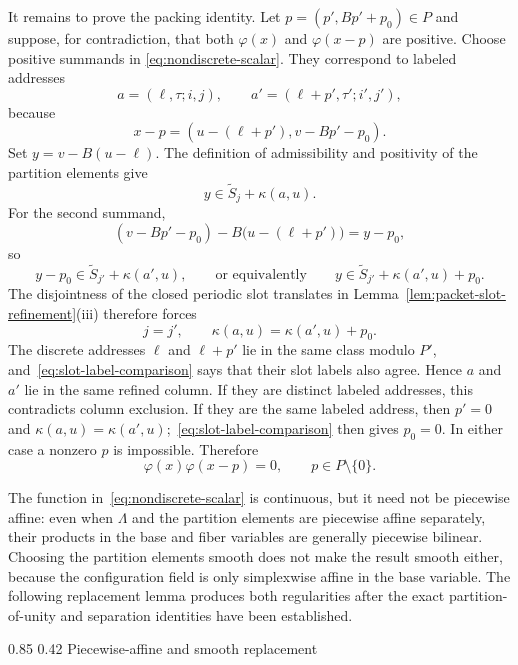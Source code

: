 \documentclass[11pt,reqno]{amsart}
\makeatletter
\numberwithin{equation}{section}
\renewcommand\subsection{\@startsection{subsection}{2}{\z@}%
  {0.85\baselineskip \@plus 0.25\baselineskip \@minus 0.10\baselineskip}%
  {0.42\baselineskip}%
  {\normalfont\bfseries}}
\theoremstyle{definition}
\theoremstyle{remark}
\makeatother
\begin{document}
It remains to prove the packing identity.  Let
$p=(p',Bp'+p_0)\in P$ and suppose, for contradiction, that both
$\varphi(x)$ and $\varphi(x-p)$ are positive.  Choose positive summands in
\eqref{eq:nondiscrete-scalar}.  They correspond to labeled addresses
\[
 a=(\ell,\tau;i,j),
 \qquad
 a'=(\ell+p',\tau';i',j'),
\]
because
\[
 x-p=(u-(\ell+p'),v-Bp'-p_0).
\]
Set $y=v-B(u-\ell)$.  The definition of admissibility and positivity of the
partition elements give
\[
 y\in\widetilde S_j+\kappa(a,u).
\]
For the second summand,
\[
 (v-Bp'-p_0)-B\bigl(u-(\ell+p')\bigr)=y-p_0,
\]
so
\[
 y-p_0\in\widetilde S_{j'}+\kappa(a',u),
 \qquad\text{or equivalently}\qquad
 y\in\widetilde S_{j'}+\kappa(a',u)+p_0.
\]
The disjointness of the closed periodic slot translates in
Lemma~\ref{lem:packet-slot-refinement}(iii) therefore forces
\begin{equation}\label{eq:slot-label-comparison}
 j=j',
 \qquad
 \kappa(a,u)=\kappa(a',u)+p_0.
\end{equation}
The discrete addresses $\ell$ and $\ell+p'$ lie in the same class modulo
$P'$, and~\eqref{eq:slot-label-comparison} says that their slot labels also
agree.  Hence $a$ and $a'$ lie in the same refined column.  If they are
distinct labeled addresses, this contradicts column exclusion.  If they are
the same labeled address, then $p'=0$ and
$\kappa(a,u)=\kappa(a',u)$;~\eqref{eq:slot-label-comparison} then gives
$p_0=0$.  In either case a nonzero $p$ is impossible.  Therefore
\begin{equation}\label{eq:nondiscrete-separation}
 \varphi(x)\varphi(x-p)=0,
 \qquad p\in P\setminus\{0\}.
\end{equation}

The function in~\eqref{eq:nondiscrete-scalar} is continuous, but it need
not be piecewise affine: even when $\Lambda$ and the partition elements are
piecewise affine separately, their products in the base and fiber variables
are generally piecewise bilinear.  Choosing the partition elements smooth
does not make the result smooth either, because the configuration field is
only simplexwise affine in the base variable.  The following replacement
lemma produces both regularities after the exact partition-of-unity and
separation identities have been established.

\subsection{Piecewise-affine and smooth replacement}
\label{sec:pou-replacement}
\end{document}
